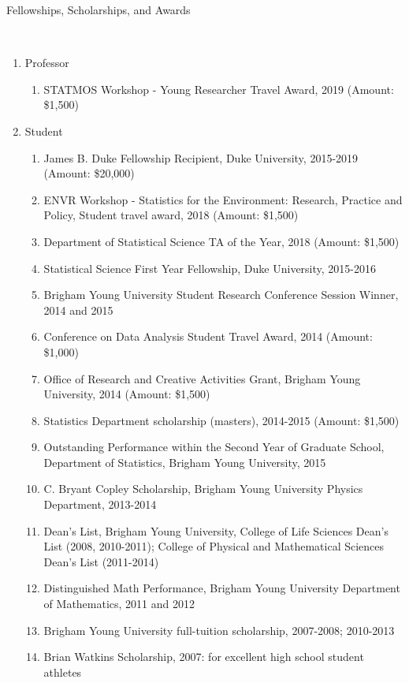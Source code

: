 \documentclass[12pt]{article}
\newcommand{\head}[1]{ %
    \bigskip %
    \begin{large}\begin{bf}{#1}\end{bf}\end{large} %

    \ \\ [-1.3cm] %

    \hrulefill}
\begin{document}
\head{Fellowships, Scholarships, and Awards}
\begin{enumerate}[label=$\bullet$]

\item Professor
\begin{enumerate}[label=$\cdot$]
\item STATMOS Workshop - Young Researcher Travel Award, 2019  (Amount: \$1,500)
\end{enumerate}
\item Student
\begin{enumerate}[label=$\cdot$]
\item James B. Duke Fellowship Recipient, Duke University, 2015-2019 (Amount: \$20,000)
\item ENVR Workshop - Statistics for the Environment: Research, Practice and Policy, Student travel award, 2018 (Amount: \$1,500)
\item Department of Statistical Science TA of the Year, 2018 (Amount: \$1,500)
\item Statistical Science First Year Fellowship, Duke University, 2015-2016 
\item Brigham Young University Student Research Conference Session Winner, 2014 and 2015
\item Conference on Data Analysis Student Travel Award, 2014 (Amount: \$1,000)
\item Office of Research and Creative Activities Grant, Brigham Young University, 2014 (Amount: \$1,500)
\item Statistics Department scholarship (masters), 2014-2015  (Amount: \$1,500)
\item Outstanding Performance within the Second Year of Graduate School, Department of Statistics, Brigham Young University, 2015
\item C. Bryant Copley Scholarship, Brigham Young University Physics Department, 2013-2014
\item Dean's List, Brigham Young University, College of Life Sciences Dean's List (2008, 2010-2011); College of Physical and Mathematical Sciences Dean’s List (2011-2014)
\item Distinguished Math Performance, Brigham Young University Department of Mathematics, 2011 and 2012
\item Brigham Young University full-tuition scholarship, 2007-2008; 2010-2013 
\item Brian Watkins Scholarship, 2007: for excellent high school student athletes
\end{enumerate}

\end{enumerate}
\end{document}
